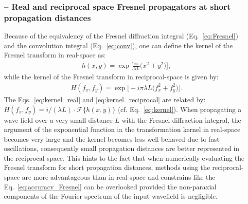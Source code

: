 \begin{refsection}
\subsubsection*{\normalsize -- Real and reciprocal space Fresnel propagators at short propagation distances }

Because of the equivalency of the Fresnel diffraction integral (Eq.~\ref{eq:Fresnel}) and the convolution integral (Eq.~\ref{eq:conv}), one can define the kernel of the Fresnel transform in real-space as:
\begin{align}\label{eq:kernel_real}
    h(x,y)=\exp\bigg[\frac{i\pi}{\lambda L}\big(x^2+y^2 \big)\bigg],
\end{align}{}
while the kernel of the Fresnel transform in reciprocal-space is given by:
\begin{align}\label{eq:kernel_reciprocal}
    H(f_x,f_y)=\exp{\bigg[-i\pi\lambda L\big(f_x^2+f_y^2 \big)\bigg]}.
\end{align}{}
The Eqs.~\ref{eq:kernel_real} and \ref{eq:kernel_reciprocal} are related by: $H(f_x,f_y)=i/(\lambda L)\cdot \mathcal{F}\{ h(x,y)\}$ (cf. Eq.~\ref{eq:kernel}). When propagating a wave-field over a very small distance $L$ with the Fresnel diffraction integral, the argument of the exponential function in the transformation kernel in real-space becomes very large and the kernel becomes less well-behaved due to fast oscillations, consequently small propagation distances are better represented in the reciprocal space. This hints to the fact that when numerically evaluating the Fresnel transform for short propagation distances, methods using the reciprocal-space are more advantageous than in real-space and constrains like the Eq.~\ref{eq:accuracy_Fresnel} can be overlooked provided the non-paraxial components of the Fourier spectrum of the input wavefield is negligible.




\end{refsection}
